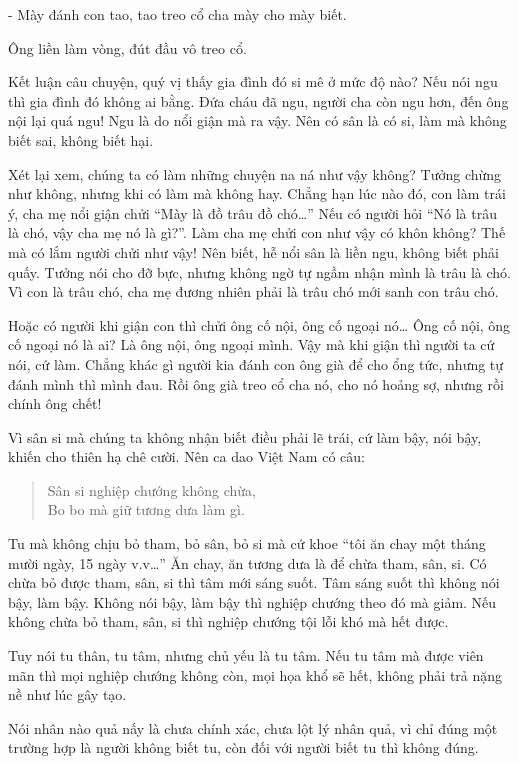 \documentclass[
  12pt,
  oneside]{book}
\begin{document}
- Mày đánh con tao, tao treo cổ cha mày cho mày biết.

Ông liền làm vòng, đút đầu vô treo cổ.

Kết luận câu chuyện, quý vị thấy gia đình đó si mê ở mức độ nào? Nếu nói ngu thì gia đình đó không ai bằng. Đứa cháu đã ngu, người cha còn ngu hơn, đến ông nội lại quá ngu! Ngu là do nổi giận mà ra vậy. Nên có sân là có si, làm mà không biết sai, không biết hại.

Xét lại xem, chúng ta có làm những chuyện na ná như vậy không? Tưởng chừng như không, nhưng khi có làm mà không hay. Chẳng hạn lúc nào đó, con làm trái ý, cha mẹ nổi giận chửi ``Mày là đồ trâu đồ chó\ldots{}'' Nếu có người hỏi ``Nó là trâu là chó, vậy cha mẹ nó là gì?''. Làm cha mẹ chửi con như vậy có khôn không? Thế mà có lắm người chửi như vậy! Nên biết, hễ nổi sân là liền ngu, không biết phải quấy. Tưởng nói cho đỡ bực, nhưng không ngờ tự ngầm nhận mình là trâu là chó. Vì con là trâu chó, cha mẹ đương nhiên phải là trâu chó mới sanh con trâu chó.

Hoặc có người khi giận con thì chửi ông cố nội, ông cố ngoại nó\ldots{} Ông cố nội, ông cố ngoại nó là ai? Là ông nội, ông ngoại mình. Vậy mà khi giận thì người ta cứ nói, cứ làm. Chẳng khác gì người kia đánh con ông già để cho ổng tức, nhưng tự đánh mình thì mình đau. Rồi ông già treo cổ cha nó, cho nó hoảng sợ, nhưng rồi chính ông chết!

Vì sân si mà chúng ta không nhận biết điều phải lẽ trái, cứ làm bậy, nói bậy, khiến cho thiên hạ chê cười. Nên ca dao Việt Nam có câu:

\begin{quote}
Sân si nghiệp chướng không chừa,\\
Bo bo mà giữ tương dưa làm gì.
\end{quote}

Tu mà không chịu bỏ tham, bỏ sân, bỏ si mà cứ khoe ``tôi ăn chay một tháng mười ngày, 15 ngày v.v\ldots{}'' Ăn chay, ăn tương dưa là để chừa tham, sân, si. Có chừa bỏ được tham, sân, si thì tâm mới sáng suốt. Tâm sáng suốt thì không nói bậy, làm bậy. Không nói bậy, làm bậy thì nghiệp chướng theo đó mà giảm. Nếu không chừa bỏ tham, sân, si thì nghiệp chướng tội lỗi khó mà hết được.

Tuy nói tu thân, tu tâm, nhưng chủ yếu là tu tâm. Nếu tu tâm mà được viên mãn thì mọi nghiệp chướng không còn, mọi họa khổ sẽ hết, không phải trả nặng nề như lúc gây tạo.

Nói nhân nào quả nấy là chưa chính xác, chưa lột lý nhân quả, vì chỉ đúng một trường hợp là người không biết tu, còn đối với người biết tu thì không đúng.
\end{document}
